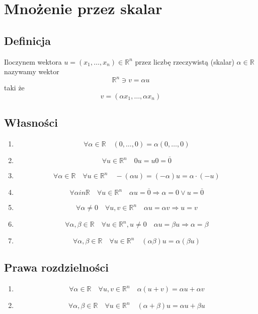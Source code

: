 \documentclass[11pt]{article}
\begin{document}
\section{Mnożenie przez skalar}
\subsection{Definicja}
Iloczynem wektora $ u = (x_1,\ldots, x_n) \in \mathbb{R}^n$ przez liczbę rzeczywistą (skalar) $ \alpha \in \mathbb{R}$ nazywamy wektor $$ \mathbb{R}^n \ni v = \alpha u$$ taki że 
$$ v = (\alpha x_1 , \ldots , \alpha x_n )$$
\subsection{Własności}
\begin{enumerate}
\item{$$ \forall \alpha \in \mathbb{R} \quad (0,\ldots , 0) = \alpha (0, \ldots, 0)$$}
\item{$$ \forall u \in \mathbb{R}^n \quad 0 u = u 0 = \overline{0} $$}
\item{$$\forall \alpha \in \mathbb{R} \quad \forall u \in \mathbb{R}^n \quad -(\alpha u) = (-\alpha)u = \alpha \cdot (-u) $$}
\item{$$\forall \alpha in \mathbb{R} \quad \forall u \in \mathbb{R}^n \quad \alpha u = \overline{0} \Longrightarrow \alpha = 0 \vee u = \overline{0} $$}
\item{$$ \forall \alpha \not = 0 \quad \forall u,v \in \mathbb{R}^n \quad \alpha u = \alpha v \Longrightarrow u = v$$}
\item{$$ \forall  \alpha, \beta \in \mathbb{R} \quad \forall u \in \mathbb{R}^n, u \not = 0 \quad \alpha u = \beta u \Longrightarrow \alpha = \beta $$}
\item{$$ \forall \alpha , \beta \in \mathbb{R} \quad \forall u \in \mathbb{R}^n \quad (\alpha \beta)u = \alpha(\beta u)$$}

\end{enumerate}

\subsection{Prawa rozdzielności}
\begin{enumerate}
\item{$$ \forall \alpha \in \mathbb{R} \quad \forall u , v \in \mathbb{R}^n \quad \alpha(u + v) = \alpha u + \alpha v$$}
\item{$$ \forall \alpha, \beta \in \mathbb{R} \quad \forall u \in \mathbb{R}^n \quad (\alpha + \beta)u = \alpha u + \beta u$$}
\end{enumerate}
\end{document}
